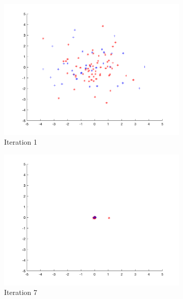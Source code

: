 \begin{figure}
  \begin{subfigure}[b]{0.4\textwidth}
    \includegraphics[width=\textwidth]{img/smpl/sphr/loa-iter-1}
    \caption{Iteration 1}
    \label{fig:s2-iter-0}
  \end{subfigure}
  \begin{subfigure}[b]{0.4\textwidth}
    \includegraphics[width=\textwidth]{img/smpl/sphr/loa-iter-7}
    \caption{Iteration 7}
    \label{fig:s2-iter-1}
  \end{subfigure}
  \begin{subfigure}[b]{0.4\textwidth}

\end{subfigure}
\end{figure}
